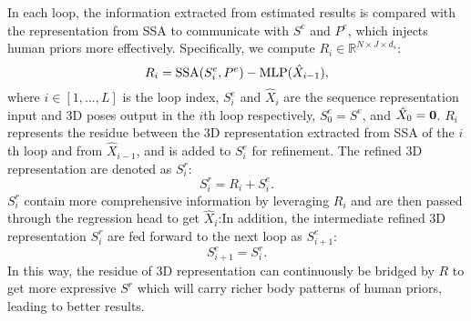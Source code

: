 \documentclass{article}
\begin{document}
In each loop, the information extracted from estimated results is compared with the representation from SSA to communicate with $S^e$ and $P^e$, which injects human priors more effectively. Specifically, we compute $R_i\in\mathbb R^{N\times J\times d_s}$:
\begin{equation}
    R_i = {\rm SSA}(S^e_i, P^e) - {\rm MLP}(\hat X_{i-1}),
\end{equation}
where $i\in[1,...,L]$ is the loop index, 
$S^e_i$ and $\hat X_{i}$ are the sequence representation input and 3D poses output in the $i$th loop respectively, $S^e_0=S^e$, and $\hat X_0=\bf 0$. $R_i$ represents  
the residue between the 3D representation extracted from SSA of the $i$th loop and from $\hat X_{i-1}$, 
and is added to $S^e_i$ for refinement. The refined 3D representation are denoted as $S^r_i$:\begin{equation}
    S^r_i = R_i + S^e_i.
\end{equation}
$S^r_i$ contain more comprehensive information by leveraging $R_i$ and are then passed through the regression head to get $\hat X_i$:In addition, the intermediate refined 3D representation $S^r_i$ are fed forward to the next loop as $S^e_{i+1}$:
\begin{equation}
    S^e_{i+1} = S^r_i.
\end{equation}
In this way, the residue of 3D representation can continuously be bridged by $R$ to get more expressive $S^r$ which will carry richer body patterns of human priors, leading to better results.
\fi

\vspace{-0.5em}
\end{document}
